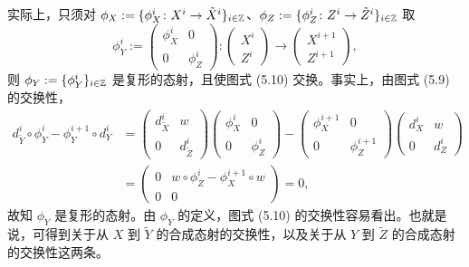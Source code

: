 实际上，只须对 $\phi_X := \{\phi^i_X\colon X^i\to\tilde X^i\}_{i\in\mathbb{Z}}$、$\phi_Z := \{\phi^i_Z\colon Z^i\to\tilde Z^i\}_{i\in\mathbb{Z}}$ 取
\[
\phi^i_Y := \begin{pmatrix} \phi^i_X & 0 \\ 0 & \phi^i_Z\end{pmatrix}\colon
\begin{pmatrix} X^i \\ Z^i\end{pmatrix}\longrightarrow
\begin{pmatrix} X^{i+1} \\ Z^{i+1}\end{pmatrix},
\]
则 $\phi_Y := \{\phi^i_Y\}_{i\in\mathbb{Z}}$ 是复形的态射，且使图式 (5.10) 交换。事实上，由图式 (5.9) 的交换性，
\[
\begin{aligned}
d^i_{\tilde Y}\circ\phi^i_Y - \phi^{i+1}_Y\circ d^i_Y
&= \begin{pmatrix} d^i_{\tilde X} & w \\ 0 & d^i_{\tilde Z}\end{pmatrix}\begin{pmatrix} \phi^i_X & 0 \\ 0 & \phi^i_Z\end{pmatrix}
- \begin{pmatrix} \phi^{i+1}_X & 0 \\ 0 & \phi^{i+1}_Z\end{pmatrix}\begin{pmatrix} d^i_X & w \\ 0 & d^i_Z\end{pmatrix}\\
&= \begin{pmatrix} 0 & w\circ\phi^i_Z - \phi^{i+1}_X\circ w \\ 0 & 0\end{pmatrix} = 0,
\end{aligned}
\]
故知 $\phi_Y$ 是复形的态射。由 $\phi_Y$ 的定义，图式 (5.10) 的交换性容易看出。也就是说，可得到关于从 $X$ 到 $\tilde Y$ 的合成态射的交换性，以及关于从 $Y$ 到 $\tilde Z$ 的合成态射的交换性这两条。


